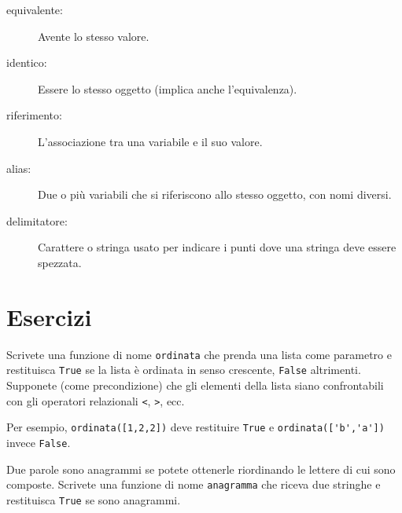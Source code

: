 \documentclass[10pt]{book}
\begin{document}
\begin{description}
\item[equivalente:] Avente lo stesso valore.

\item[identico:] Essere lo stesso oggetto (implica anche l'equivalenza).

\item[riferimento:] L'associazione tra una variabile e il suo valore.

\item[alias:] Due o più variabili che si riferiscono allo stesso oggetto, con nomi diversi.

\item[delimitatore:] Carattere o stringa usato per indicare i punti dove una stringa deve essere spezzata.

\end{description}


\section{Esercizi}

\begin{exercise}
Scrivete una funzione di nome \verb"ordinata" che prenda una lista come parametro e restituisca {\tt True} se la lista è ordinata in senso crescente, {\tt False} altrimenti. Supponete (come precondizione) che gli elementi della lista siano confrontabili con gli operatori relazionali {\tt <}, {\tt >}, ecc.

Per esempio, \verb"ordinata([1,2,2])" deve restituire {\tt True}
e \verb"ordinata(['b','a'])" invece {\tt False}.
\end{exercise}

\vspace{0.2in}
\begin{exercise}
\label{anagram}

Due parole sono anagrammi se potete ottenerle riordinando le lettere di cui sono composte. Scrivete una funzione di nome \verb"anagramma"
che riceva due stringhe e restituisca {\tt True} se sono anagrammi.
\end{exercise}
\end{document}
